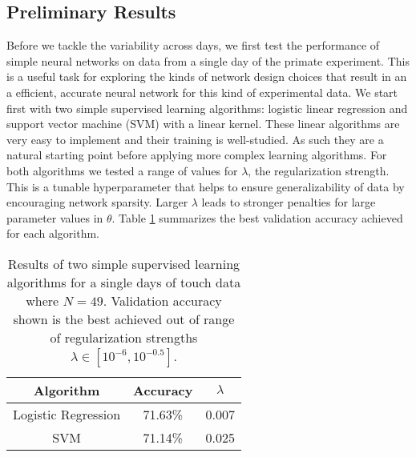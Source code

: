 \documentclass[12pt]{article}
\begin{document}
\subsection{Preliminary Results}
\indent Before we tackle the variability across days, we first test the performance of simple neural networks on data from a single day of the primate experiment. This is a useful task for exploring the kinds of network design choices that result in an a efficient, accurate neural network for this kind of experimental data. We start first with two simple supervised learning algorithms:  logistic linear regression and support vector machine (SVM) with a linear kernel. These linear algorithms are very easy to implement and their training is well-studied. As such they are a natural starting point before applying more complex learning algorithms. For both algorithms we tested a range of values for $\lambda$, the regularization strength. This is a tunable hyperparameter that helps to ensure generalizability of data by encouraging network sparsity. Larger $\lambda$ leads to stronger penalties for large parameter values in $\theta$. Table \ref{tab:simp} summarizes the best validation accuracy achieved for each algorithm. \\

\begin{table}[]
  \centering
\begin{tabular}{|c|c|c|}
  \hline
                Algorithm    & Accuracy & $\lambda$  \\
                      \hline
Logistic Regression & 71.63\%  & 0.007   \\
  \hline
SVM                 & 71.14\%  & 0.025    \\
  \hline

\end{tabular}
\caption{Results of two simple supervised learning algorithms for a single days of touch data where $N = 49$. Validation accuracy shown is the best achieved out of range of regularization strengths  $\lambda \in [10^{-6},10^{-0.5}]$.}
\label{tab:simp}
\end{table}
\end{document}
